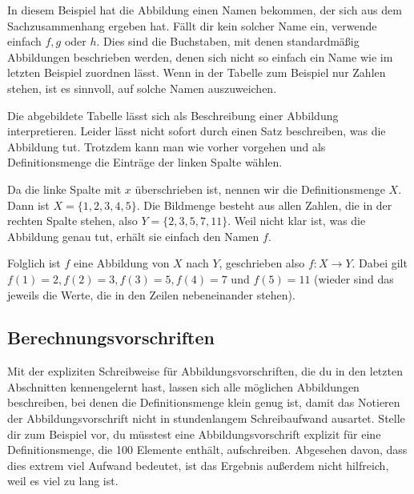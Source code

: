 \documentclass[../../main.tex]{subfiles}
\begin{document}
In diesem Beispiel hat die Abbildung einen Namen bekommen, der sich aus dem Sachzusammenhang ergeben hat. Fällt dir kein solcher Name ein, verwende einfach $f, g$ oder $h$. Dies sind die Buchstaben, mit denen standardmäßig Abbildungen beschrieben werden, denen sich nicht so einfach ein Name wie im letzten Beispiel zuordnen lässt. Wenn in der Tabelle zum Beispiel nur Zahlen stehen, ist es sinnvoll, auf solche Namen auszuweichen.

\begin{example}{}
    
    Die abgebildete Tabelle lässt sich als Beschreibung einer Abbildung interpretieren. Leider lässt nicht sofort durch einen Satz beschreiben, was die Abbildung tut. Trotzdem kann man wie vorher vorgehen und als Definitionsmenge die Einträge der linken Spalte wählen.
    
    Da die linke Spalte mit $x$ überschrieben ist, nennen wir die Definitionsmenge $X$. Dann ist $X=\{1,2,3,4,5\}$. Die Bildmenge besteht aus allen Zahlen, die in der rechten Spalte stehen, also $Y=\{2,3,5,7,11\}$. Weil nicht klar ist, was die Abbildung genau tut, erhält sie einfach den Namen $f$.
    
    Folglich ist $f$ eine Abbildung von $X$ nach $Y$, geschrieben also $f\colon X\rightarrow Y$. Dabei gilt $f(1)=2, f(2)=3, f(3)=5, f(4)=7$ und $f(5)=11$ (wieder sind das jeweils die Werte, die in den Zeilen nebeneinander stehen).
\end{example}

\subsection{Berechnungsvorschriften}
\label{sec:abbildungen_berechnungsvorschriften}

Mit der expliziten Schreibweise für Abbildungsvorschriften, die du in den letzten Abschnitten kennengelernt hast, lassen sich alle möglichen Abbildungen beschreiben, bei denen die Definitionsmenge klein genug ist, damit das Notieren der Abbildungsvorschrift nicht in stundenlangem Schreibaufwand ausartet. Stelle dir zum Beispiel vor, du müsstest eine Abbildungsvorschrift explizit für eine Definitionsmenge, die 100 Elemente enthält, aufschreiben. Abgesehen davon, dass dies extrem viel Aufwand bedeutet, ist das Ergebnis außerdem nicht hilfreich, weil es viel zu lang ist.
\end{document}

